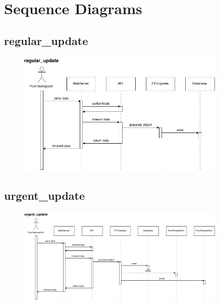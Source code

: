 \section{Sequence Diagrams}

\subsection{regular\_update}
\begin{figure}[!ht]
\begin{center}
	\includegraphics[width=10cm]{images/regular_update}
	\caption{}
\end{center}
\end{figure}
\FloatBarrier

\subsection{urgent\_update}
\begin{figure}[!ht]
\begin{center}
	\includegraphics[width=10cm]{images/urgent_update}
	\caption{}
\end{center}
\end{figure}
\FloatBarrier

